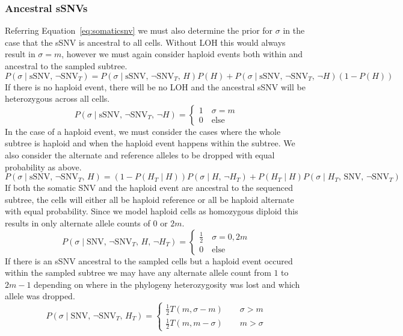 \documentclass[../../main.tex]{subfiles}
\begin{document}
\subsubsection*{Ancestral sSNVs}
Referring Equation~\eqref{eq:somaticsnv} we must also determine the prior for $\sigma$ in the case that the sSNV is ancestral to all cells. Without LOH this would always result in $\sigma=m$, however we must again consider haploid events both within and ancestral to the sampled subtree.
\begin{equation} \label{eq:ancestralsnv}
P(\sigma\mid\text{sSNV},\,\neg\text{SNV}_T)=P(\sigma\mid\text{sSNV},\,\neg\text{SNV}_T,\,H)P(H)+P(\sigma\mid\text{sSNV},\,\neg\text{SNV}_T,\,\neg H)(1-P(H))
\end{equation}
If there is no haploid event, there will be no LOH and the ancestral sSNV will be heterozygous across all cells.
\begin{equation*}
P(\sigma\mid\text{sSNV},\,\neg\text{SNV}_T,\,\neg H) = \begin{cases}1\quad \sigma=m\\ 0\quad\text{else}\end{cases}
\end{equation*}
In the case of a haploid event, we must consider the cases where the whole subtree is haploid and when the haploid event happens within the subtree. We also consider the alternate and reference alleles to be dropped with equal probability as above.
\begin{equation*}
P(\sigma\mid\text{sSNV},\,\neg\text{SNV}_T,\,H)=(1-P(H_T\mid H))P(\sigma\mid H,\,\neg H_T)+P(H_T\mid H)P(\sigma\mid H_T,\,\text{SNV},\,\neg\text{SNV}_T)
\end{equation*}
If both the somatic SNV and the haploid event are ancestral to the sequenced subtree, the cells will either all be haploid reference or all be haploid alternate with equal probability. Since we model haploid cells as homozygous diploid this results in only alternate allele counts of $0$ or $2m$.
\begin{equation*}
P(\sigma\mid\text{SNV},\,\neg\text{SNV}_T,\,H,\,\neg H_T)= \begin{cases} \frac{1}{2} \quad \sigma=0,2m\\0\quad \text{else} \end{cases}
\end{equation*}
If there is an sSNV ancestral to the sampled cells but a haploid event occured within the sampled subtree we may have any alternate allele count from $1$ to $2m-1$ depending on where in the phylogeny heterozygosity was lost and which allele was dropped.
\begin{equation*}
P(\sigma\mid\text{SNV},\,\neg\text{SNV}_T,\,H_T) = \begin{cases} \frac{1}{2}T(m,\sigma-m)\qquad \sigma > m\\
\frac{1}{2}T(m,m-\sigma)\qquad m > \sigma \end{cases}
\end{equation*}
\end{document}
